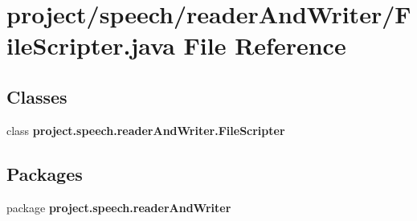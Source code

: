 \section{project/speech/reader\+And\+Writer/\+File\+Scripter.java File Reference}
\label{_file_scripter_8java}
\subsection*{Classes}
\begin{DoxyCompactItemize}
\item 
class {\bf project.\+speech.\+reader\+And\+Writer.\+File\+Scripter}
\end{DoxyCompactItemize}
\subsection*{Packages}
\begin{DoxyCompactItemize}
\item 
package {\bf project.\+speech.\+reader\+And\+Writer}
\end{DoxyCompactItemize}
